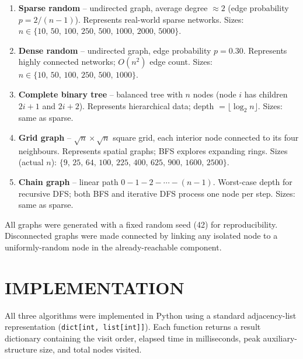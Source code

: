 \documentclass[12pt]{article}
\begin{document}
\begin{enumerate}
  \item \textbf{Sparse random} -- undirected graph, average degree $\approx 2$
        (edge probability $p = 2/(n-1)$). Represents real-world sparse networks.
        Sizes: $n \in \{10,\,50,\,100,\,250,\,500,\,1000,\,2000,\,5000\}$.

  \item \textbf{Dense random} -- undirected graph, edge probability $p = 0.30$.
        Represents highly connected networks; $O(n^2)$ edge count.
        Sizes: $n \in \{10,\,50,\,100,\,250,\,500,\,1000\}$.

  \item \textbf{Complete binary tree} -- balanced tree with $n$ nodes (node $i$
        has children $2i+1$ and $2i+2$).  Represents hierarchical data; depth
        $= \lfloor \log_2 n \rfloor$.
        Sizes: same as sparse.

  \item \textbf{Grid graph} -- $\sqrt{n} \times \sqrt{n}$ square grid, each
        interior node connected to its four neighbours.  Represents spatial
        graphs; BFS explores expanding rings.
        Sizes (actual $n$): $\{9,\,25,\,64,\,100,\,225,\,400,\,625,\,900,\,1600,\,2500\}$.

  \item \textbf{Chain graph} -- linear path $0 \!-\! 1 \!-\! 2 \!-\! \cdots \!-\! (n\!-\!1)$.
        Worst-case depth for recursive DFS; both BFS and iterative DFS process one
        node per step.
        Sizes: same as sparse.
\end{enumerate}

All graphs were generated with a fixed random seed (42) for reproducibility.
Disconnected graphs were made connected by linking any isolated node to a
uniformly-random node in the already-reachable component.

\section*{IMPLEMENTATION}

\hspace{0.8cm} All three algorithms were implemented in Python using a standard
adjacency-list representation (\texttt{dict[int, list[int]]}).  Each function
returns a result dictionary containing the visit order, elapsed time in
milliseconds, peak auxiliary-structure size, and total nodes visited.
\end{document}
